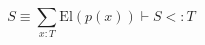 \begin{equation}\label{eq:subtype}
  S \equiv \sum_{x: T} \text{El}(p(x)) \vdash S <: T 
\end{equation}